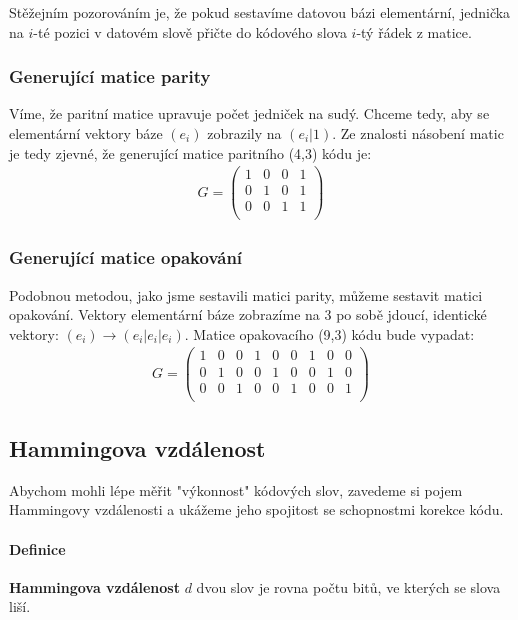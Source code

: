 \documentclass[a4paper,12pt]{article}
\begin{document}
Stěžejním pozorováním je, že pokud sestavíme datovou bázi elementární, jednička 
na $i$-té pozici v datovém slově přičte do kódového slova $i$-tý řádek z matice.

\subsubsection{Generující matice parity}
Víme, že paritní matice upravuje počet jedniček na sudý. Chceme tedy, aby se 
elementární vektory báze $(e_i)$ zobrazily na $(e_i | 1)$. Ze znalosti násobení 
matic je tedy zjevné, že generující matice paritního (4,3) kódu je:
\begin{align}
	G = \left( \begin{matrix}
		1 & 0 & 0 & 1\\
		0 & 1 & 0 & 1\\
		0 & 0 & 1 & 1\\
	\end{matrix}
	\right)
\end{align}

\subsubsection{Generující matice opakování}
Podobnou metodou, jako jsme sestavili matici parity, můžeme sestavit matici 
opakování. Vektory elementární báze zobrazíme na 3 po sobě jdoucí, identické 
vektory: $(e_i) \to (e_i|e_i|e_i)$. Matice opakovacího (9,3) kódu bude vypadat:
\begin{align}
	G = \left( \begin{matrix}
		1 & 0 & 0 & 1 & 0 & 0 & 1 & 0 & 0 \\
		0 & 1 & 0 & 0 & 1 & 0 & 0 & 1 & 0 \\
		0 & 0 & 1 & 0 & 0 & 1 & 0 & 0 & 1 \\
	\end{matrix} \right)
\end{align}

\subsection{Hammingova vzdálenost}
Abychom mohli lépe měřit "výkonnost" kódových slov, zavedeme si pojem Hammingovy 
vzdálenosti a ukážeme jeho spojitost se schopnostmi korekce kódu.
\paragraph{Definice}
\textbf{Hammingova vzdálenost} $d$ dvou slov je rovna počtu bitů, ve kterých se 
slova liší.
\end{document}
